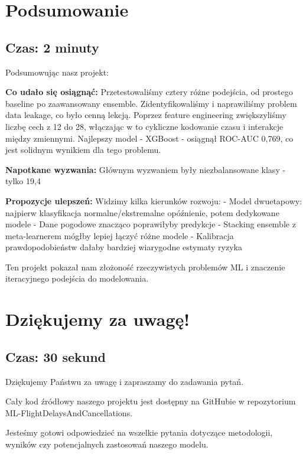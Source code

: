 \documentclass[12pt,a4paper]{article}
\begin{document}
\section{Podsumowanie}
\subsection{Czas: 2 minuty}

Podsumowując nasz projekt:

\textbf{Co udało się osiągnąć:}
Przetestowaliśmy cztery różne podejścia, od prostego baseline po zaawansowany ensemble. Zidentyfikowaliśmy i naprawiliśmy problem data leakage, co było cenną lekcją. Poprzez feature engineering zwiększyliśmy liczbę cech z 12 do 28, włączając w to cykliczne kodowanie czasu i interakcje między zmiennymi. Najlepszy model - XGBoost - osiągnął ROC-AUC 0,769, co jest solidnym wynikiem dla tego problemu.

\textbf{Napotkane wyzwania:}
Głównym wyzwaniem były niezbalansowane klasy - tylko 19,4%

\textbf{Propozycje ulepszeń:}
Widzimy kilka kierunków rozwoju:
- Model dwuetapowy: najpierw klasyfikacja normalne/ekstremalne opóźnienie, potem dedykowane modele
- Dane pogodowe znacząco poprawiłyby predykcje
- Stacking ensemble z meta-learnerem mógłby lepiej łączyć różne modele
- Kalibracja prawdopodobieństw dałaby bardziej wiarygodne estymaty ryzyka

Ten projekt pokazał nam złożoność rzeczywistych problemów ML i znaczenie iteracyjnego podejścia do modelowania.

\section{Dziękujemy za uwagę!}
\subsection{Czas: 30 sekund}

Dziękujemy Państwu za uwagę i zapraszamy do zadawania pytań.

Cały kod źródłowy naszego projektu jest dostępny na GitHubie w repozytorium ML-FlightDelaysAndCancellations.

Jesteśmy gotowi odpowiedzieć na wszelkie pytania dotyczące metodologii, wyników czy potencjalnych zastosowań naszego modelu.
\end{document}
